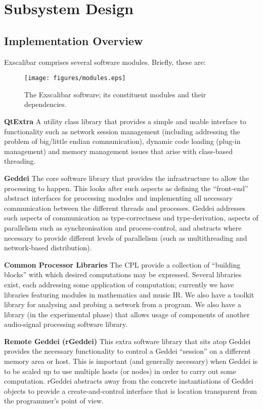 \section{Subsystem Design}

\subsection{Implementation Overview}\label{sec:components}

Exscalibar comprises several software modules. Briefly, these are:

\begin{figure}[ht!]
\centering
\texttt{[image: figures/modules.eps]}
\caption{The Exscalibar software; its constituent modules and their dependencies.}
\label{fig:modules}
\end{figure}

{\bf QtExtra} A utility class library that provides a simple and usable interface to functionality such as network session management (including addressing the problem of big/little endian communication), dynamic code loading (plug-in management) and memory management issues that arise with class-based threading.

{\bf Geddei} The core software library that provides the infrastructure to allow the processing to happen. This looks after such aspects as defining the ``front-end'' abstract interfaces for processing modules and implementing all necessary communication between the different threads and processes. Geddei addresses such aspects of communication as type-correctness and type-derivation, aspects of parallelism such as synchronisation and process-control, and abstracts where necessary to provide different levels of parallelism (such as multithreading and network-based distribution).

{\bf Common Processor Libraries} The CPL provide a collection of ``building blocks'' with which desired computations may be expressed. Several libraries exist, each addressing some application of computation; currently we have libraries featuring modules in mathematics and music IR. We also have a toolkit library for analysing and probing a network from a program. We also have a library (in the experimental phase) that allows usage of components of another audio-signal processing software library.

{\bf Remote Geddei (rGeddei)} This extra software library that sits atop Geddei provides the necessary functionality to control a Geddei ``session'' on a different memory area or host. This is important (and generally necessary) when Geddei is to be scaled up to use multiple hosts (or nodes) in order to carry out some computation. rGeddei abstracts away from the concrete instantiations of Geddei objects to provide a create-and-control interface that is location transparent from the programmer's point of view.

